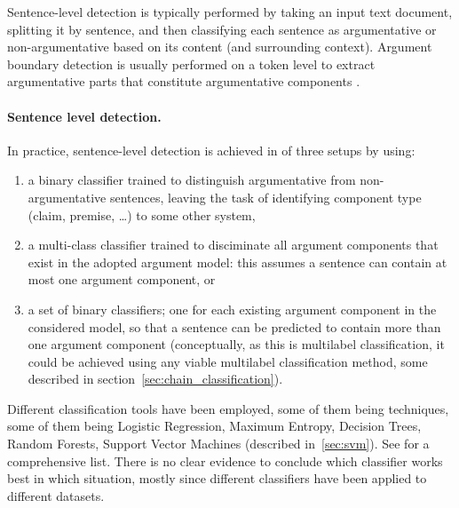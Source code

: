 Sentence-level detection is typically performed by taking an input text
document, splitting it by sentence, and then classifying each sentence as
argumentative or non-argumentative based on its content (and surrounding
context). Argument boundary detection is usually performed on a token level
to extract argumentative parts that constitute argumentative components
\citep{lippi2016argumentation}.

\paragraph{Sentence level detection.} 
In practice, sentence-level detection is achieved in of three setups by using:
\begin{enumerate}
\item a binary classifier trained to distinguish argumentative from 
	non-argumentative sentences, leaving the task of identifying component type
	(claim, premise, \dots) to some other system, 
\item a multi-class classifier trained to disciminate all argument components that
	exist in the adopted argument model: this assumes a sentence can contain at most
	one argument component, or 
\item a set of binary classifiers; one for each existing argument component in the considered model, 
	so that a sentence can be predicted to contain more than one argument component 
		(conceptually, as this is multilabel classification, it could be achieved 
		using any viable multilabel classification method, some described in 
		section~\ref{sec:chain_classification}).
\end{enumerate}
Different classification tools have been employed, some of them being 
techniques, some of them being Logistic Regression, Maximum Entropy, Decision
Trees, Random Forests, Support Vector Machines (described in~\ref{sec:svm}).
See \citep{lippi2016argumentation} for a comprehensive list.
There is no clear evidence to conclude which classifier works best 
in which situation, mostly since different classifiers have been applied
to different datasets. 

